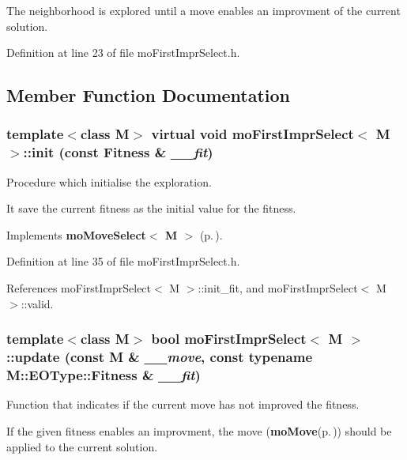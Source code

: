 The neighborhood is explored until a move enables an improvment of the current solution. 



Definition at line 23 of file mo\-First\-Impr\-Select.h.

\subsection{Member Function Documentation}
\subsubsection{\setlength{\rightskip}{0pt plus 5cm}template$<$class M$>$ virtual void {\bf mo\-First\-Impr\-Select}$<$ M $>$::init (const {\bf Fitness} \& {\em \_\-\_\-fit})\hspace{0.3cm}{\tt  [inline, virtual]}}\label{classmo_first_impr_select_4c5ce18ede46247a439c68f6954a4055}


Procedure which initialise the exploration. 

It save the current fitness as the initial value for the fitness. 

Implements {\bf mo\-Move\-Select$<$ M $>$} {\rm (p.\,\pageref{classmo_move_select_bca4c43f13d26eca7163aeb272a4a52e})}.

Definition at line 35 of file mo\-First\-Impr\-Select.h.

References mo\-First\-Impr\-Select$<$ M $>$::init\_\-fit, and mo\-First\-Impr\-Select$<$ M $>$::valid.
\subsubsection{\setlength{\rightskip}{0pt plus 5cm}template$<$class M$>$ bool {\bf mo\-First\-Impr\-Select}$<$ M $>$::update (const M \& {\em \_\-\_\-move}, const typename M::EOType::Fitness \& {\em \_\-\_\-fit})\hspace{0.3cm}{\tt  [inline]}}\label{classmo_first_impr_select_7ba0882728daedc75c249647c070ccf0}


Function that indicates if the current move has not improved the fitness. 

If the given fitness enables an improvment, the move ({\bf mo\-Move}{\rm (p.\,\pageref{classmo_move})}) should be applied to the current solution.

